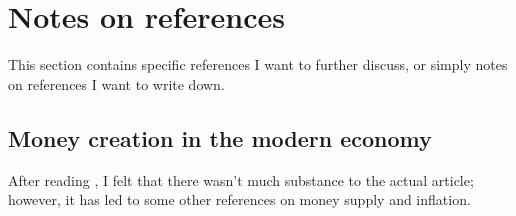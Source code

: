 \section{Notes on references}

This section contains specific references I want to further discuss, or simply notes on references I want to write down.

\subsection{Money creation in the modern economy}

After reading \cite{BOE2014}, I felt that there wasn't much substance to the actual article; however, it has led to some other references on money supply and inflation.